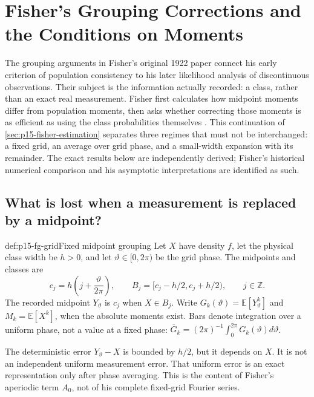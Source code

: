 \section{Fisher's Grouping Corrections and the Conditions on Moments}
\label{sec:p15-fisher-grouping}

The grouping arguments in Fisher's original 1922 paper connect his early
criterion of population consistency to his later likelihood analysis of
discontinuous observations. Their subject is the information actually
recorded: a class, rather than an exact real measurement. Fisher first
calculates how midpoint moments differ from population moments, then asks
whether correcting those moments is as efficient as using the class
probabilities themselves \cite[pp.~317--321,356--363]{Fisher1922Foundations}.
This continuation of \cref{sec:p15-fisher-estimation} separates three
regimes that must not be interchanged: a fixed grid, an average over grid
phase, and a small-width expansion with its remainder. The exact results
below are independently derived; Fisher's historical numerical comparison
and his asymptotic interpretations are identified as such.

\subsection{What is lost when a measurement is replaced by a midpoint?}

\begin{hbdefinition}{def:p15-fg-grid}{Fixed midpoint grouping}
Let \(X\) have density \(f\), let the physical class width be \(h>0\), and
let \(\vartheta\in[0,2\pi)\) be the grid phase. The midpoints and classes are
\[
 c_j=h\left(j+\frac{\vartheta}{2\pi}\right),\qquad
 B_j=[c_j-h/2,c_j+h/2),\qquad j\in\mathbb Z.
\]
The recorded midpoint \(Y_\vartheta\) is \(c_j\) when \(X\in B_j\).
Write \(G_k(\vartheta)=\mathbb E[Y_\vartheta^k]\) and
\(M_k=\mathbb E[X^k]\), when the absolute moments exist. Bars denote
integration over a uniform phase, not a value at a fixed phase:
\(\overline G_k=(2\pi)^{-1}\int_0^{2\pi}G_k(\vartheta)d\vartheta\).
\end{hbdefinition}

The deterministic error \(Y_\vartheta-X\) is bounded by \(h/2\), but it
depends on \(X\). It is not an independent uniform measurement error.
That uniform error is an exact representation only after phase averaging.
This is the content of Fisher's aperiodic term \(A_0\), not of his complete
fixed-grid Fourier series.

